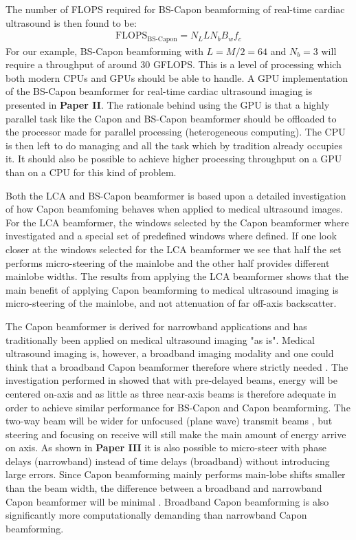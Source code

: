 The number of FLOPS required for BS-Capon beamforming of real-time cardiac ultrasound is then found to be:
\begin{align}
\text{FLOPS}_{\text{BS-Capon}} = N_LLN_bB_wf_c
\end{align}
For our example, BS-Capon beamforming with $L=M/2=64$ and $N_b=3$ will require a throughput of around $30$ GFLOPS. This is a level of processing which both modern CPUs and GPUs should be able to handle. A GPU implementation of the BS-Capon beamformer for real-time cardiac ultrasound imaging is presented in \textbf{Paper II}. The rationale behind using the GPU is that a highly parallel task like the Capon and BS-Capon beamformer should be offloaded to the processor made for parallel processing (heterogeneous computing). The CPU is then left to do managing and all the task which by tradition already occupies it. It should also be possible to achieve higher processing throughput on a GPU than on a CPU for this kind of problem.

Both the LCA and BS-Capon beamformer is based upon a detailed investigation of how Capon beamfoming behaves when applied to medical ultrasound images. For the LCA beamformer, the windows selected by the Capon beamformer where investigated and a special set of predefined windows where defined. If one look closer at the windows selected for the LCA beamformer we see that half the set performs micro-steering of the mainlobe and the other half provides different mainlobe widths. The results from applying the LCA beamformer shows that the main benefit of applying Capon beamforming to medical ultrasound imaging is micro-steering of the mainlobe, and not attenuation of far off-axis backscatter.

The Capon beamformer is derived for narrowband applications and has traditionally been applied on medical ultrasound imaging "as is". Medical ultrasound imaging is, however, a broadband imaging modality and one could think that a broadband Capon beamformer therefore where strictly needed \cite{Holfort2009}. The investigation performed in \cite{Nilsen2009} showed that with pre-delayed beams, energy will be centered on-axis and as little as three near-axis beams is therefore adequate in order to achieve similar performance for BS-Capon and Capon beamforming. The two-way beam will be wider for unfocused (plane wave) transmit beams \cite{Holfort2009, Austeng2011}, but steering and focusing on receive will still make the main amount of energy arrive on axis. As shown in \textbf{Paper III} it is also possible to micro-steer with phase delays (narrowband) instead of time delays (broadband) without introducing large errors. Since Capon beamforming mainly performs main-lobe shifts smaller than the beam width, the difference between a broadband and narrowband Capon beamformer will be minimal \cite{Diamantis2014}. Broadband Capon beamforming is also significantly more computationally demanding than narrowband Capon beamforming.

